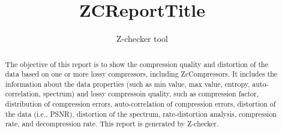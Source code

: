 \documentclass[preprint,12pt]{elsarticle}
\begin{document}
\parindent=0pt
\parskip=0pt

\begin{frontmatter}

\title{ZCReportTitle}

\author{Z-checker tool}

\begin{abstract}
The objective of this report is to show the compression quality and distortion of the data based on one or more lossy compressors, including ZcCompressors. 
It includes the information about the data properties (such as min value, max value, entropy, auto-correlation, spectrum) and lossy compressoin quality, 
such as compression factor, distribution of compression errors, auto-correlation of compression errors, distortion of the data (i.e., PSNR), distortion 
of the spectrum, rate-distortion analysis, compression rate, and decompression rate. This report is generated by Z-checker. 
\end{abstract}
\end{frontmatter}










\end{document}

